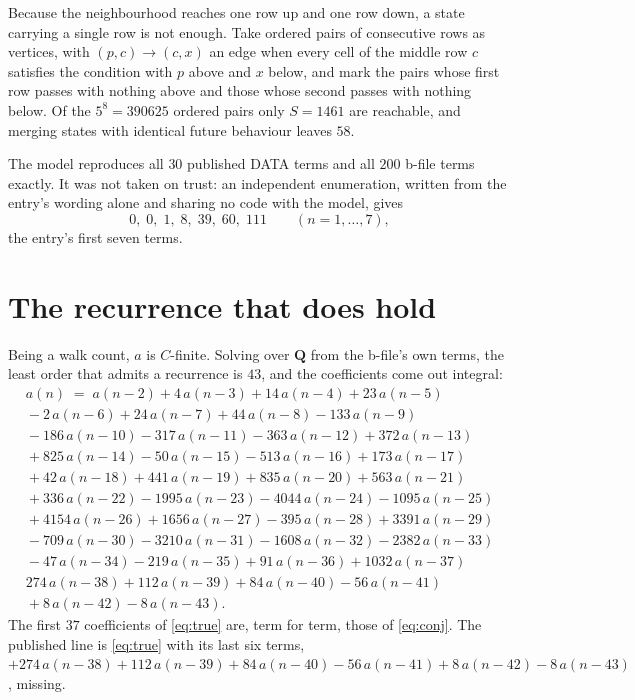 \documentclass[11pt,a4paper]{article}
\theoremstyle{plain}
\theoremstyle{definition}
\begin{document}
Because the neighbourhood reaches one row up and one row down, a state carrying a single row
is not enough. Take ordered pairs of consecutive rows as vertices, with $(p,c)\to(c,x)$ an
edge when every cell of the middle row $c$ satisfies the condition with $p$ above and $x$
below, and mark the pairs whose first row passes with nothing above and those whose second
passes with nothing below. Of the $5^{8}=390625$ ordered pairs only $S=1461$ are reachable,
and merging states with identical future behaviour leaves $58$.

The model reproduces all $30$ published DATA terms and all $200$ b-file terms exactly. It was
not taken on trust: an independent enumeration, written from the entry's wording alone and
sharing no code with the model, gives
\[
0,\;0,\;1,\;8,\;39,\;60,\;111 \qquad (n=1,\dots,7),
\]
the entry's first seven terms.

\section{The recurrence that does hold}

Being a walk count, $a$ is $C$-finite. Solving over $\mathbf{Q}$ from the b-file's own terms,
the least order that admits a recurrence is $43$, and the coefficients come out integral:
\begin{multline}\label{eq:true}
a(n)\;=\;a(n-2) + 4\,a(n-3) + 14\,a(n-4) + 23\,a(n-5)\\
{}- 2\,a(n-6) + 24\,a(n-7) + 44\,a(n-8) - 133\,a(n-9)\\
{}- 186\,a(n-10) - 317\,a(n-11) - 363\,a(n-12) + 372\,a(n-13)\\
{}+ 825\,a(n-14) - 50\,a(n-15) - 513\,a(n-16) + 173\,a(n-17)\\
{}+ 42\,a(n-18) + 441\,a(n-19) + 835\,a(n-20) + 563\,a(n-21)\\
{}+ 336\,a(n-22) - 1995\,a(n-23) - 4044\,a(n-24) - 1095\,a(n-25)\\
{}+ 4154\,a(n-26) + 1656\,a(n-27) - 395\,a(n-28) + 3391\,a(n-29)\\
{}- 709\,a(n-30) - 3210\,a(n-31) - 1608\,a(n-32) - 2382\,a(n-33)\\
{}- 47\,a(n-34) - 219\,a(n-35) + 91\,a(n-36) + 1032\,a(n-37)\\
{}274\,a(n-38) + 112\,a(n-39) + 84\,a(n-40) - 56\,a(n-41)\\
{}+ 8\,a(n-42) - 8\,a(n-43).
\end{multline}
The first $37$ coefficients of \eqref{eq:true} are, term for term, those of \eqref{eq:conj}.
The published line is \eqref{eq:true} with its last six terms,
$+274\,a(n-38)+112\,a(n-39)+84\,a(n-40)-56\,a(n-41)+8\,a(n-42)-8\,a(n-43)$, missing.
\end{document}

